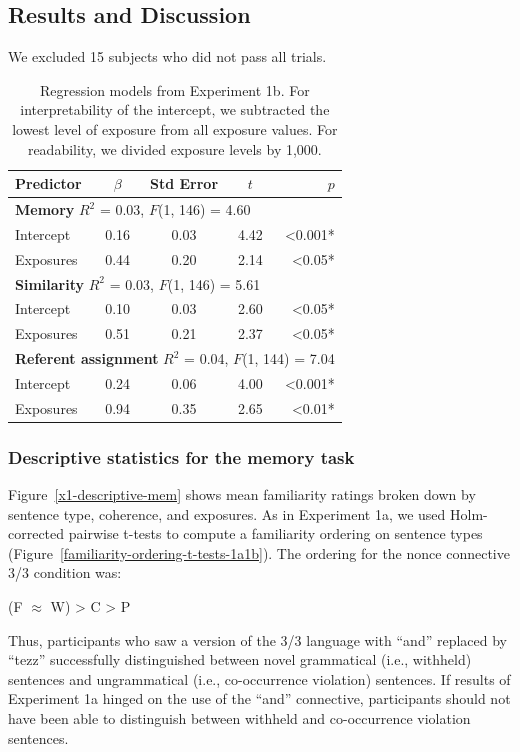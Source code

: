 \documentclass[man,floatsintext]{apa6}
\begin{document}
\subsection{Results and Discussion}
We excluded 15 subjects who did not pass all trials.

\begin{table}[t]
  \centering
  \begin{tabular}{l c c c r}
    \hline
    Predictor & $\beta$ & Std Error & $t$ & $p$ \\
    \hline
    \multicolumn{5}{l}{\small{\textbf{Memory} $R^2$ = 0.03, $F$(1, 146) = 4.60}}\\
    Intercept & 0.16 & 0.03 & 4.42 & <0.001*\\
    Exposures & 0.44 & 0.20 & 2.14 & <0.05* \\
    \hline
    \multicolumn{5}{l}{\small{\textbf{Similarity} $R^2$ = 0.03, $F$(1, 146) = 5.61}}\\
    Intercept & 0.10 & 0.03 & 2.60 & <0.05*\\
    Exposures & 0.51 & 0.21 & 2.37 & <0.05* \\
    \hline
    \multicolumn{5}{l}{\small{\textbf{Referent assignment} $R^2$ = 0.04, $F$(1, 144) = 7.04}}\\
    Intercept & 0.24 & 0.06 & 4.00 & <0.001*\\
    Exposures & 0.94 & 0.35 & 2.65 & <0.01* \\
    \hline
  \end{tabular}
  \caption{Regression models from Experiment 1b. For interpretability of the intercept, we subtracted the lowest level of exposure from all exposure values. For readability, we divided exposure levels by 1,000.}
  \label{fig:expt1b-regression}
\end{table}

\subsubsection{Descriptive statistics for the memory task}
Figure~\ref{x1-descriptive-mem} shows mean familiarity ratings broken down by sentence type, coherence, and exposures. As in Experiment 1a, we used Holm-corrected pairwise t-tests to compute a familiarity ordering on sentence types (Figure~\ref{familiarity-ordering-t-tests-1a1b}). The ordering for the nonce connective 3/3 condition was:
\begin{center}
  (F $\approx$ W) > C > P
\end{center}
\noindent Thus, participants who saw a version of the 3/3 language with ``and'' replaced by ``tezz'' successfully distinguished between novel grammatical (i.e., withheld) sentences and ungrammatical (i.e., co-occurrence violation) sentences. If results of Experiment 1a hinged on the use of the ``and'' connective, participants should not have been able to distinguish between withheld and co-occurrence violation sentences.
\end{document}
